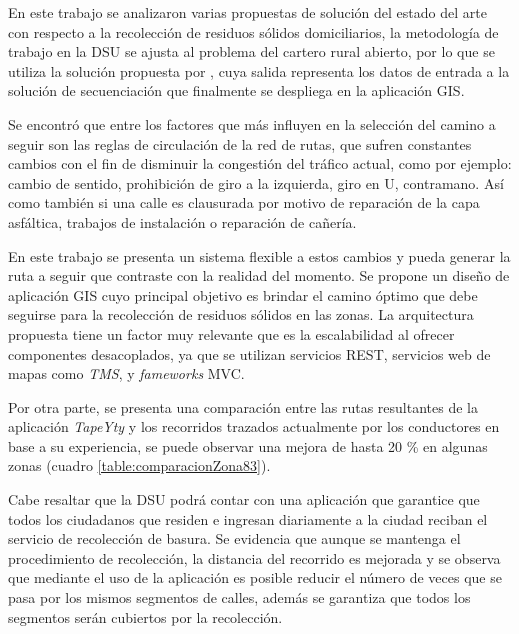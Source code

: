 


En este trabajo se analizaron varias propuestas de solución del estado del arte con respecto a la recolección de residuos sólidos domiciliarios, la metodología de trabajo en la DSU se ajusta al problema del cartero rural abierto, por lo que se utiliza la solución propuesta por \citet{Braier2017AnArgentina}, cuya salida representa los datos de entrada a la solución de secuenciación que finalmente se despliega en la aplicación GIS.

Se encontró que entre los factores que más influyen en la selección del camino a seguir son las reglas de circulación de la red de rutas, que sufren constantes cambios con el fin de disminuir la congestión del tráfico actual, como por ejemplo: cambio de sentido, prohibición de giro a la izquierda, giro en U, contramano. Así como también si una calle es clausurada por motivo de reparación de la capa asfáltica, trabajos de instalación o reparación de cañería.

En este trabajo se presenta un sistema flexible a estos cambios y pueda generar la ruta a seguir que contraste con la realidad del momento. Se propone un diseño de aplicación GIS cuyo principal objetivo es brindar el camino óptimo que debe seguirse para la recolección de residuos sólidos en las zonas. La arquitectura propuesta tiene un factor muy relevante que es la escalabilidad al ofrecer componentes desacoplados, ya que se utilizan servicios REST, servicios web de mapas como \textit{TMS}, y \textit{fameworks} MVC.

Por otra parte, se presenta una comparación entre las rutas resultantes de la aplicación \textit{TapeYty} y los recorridos trazados actualmente por los conductores en base a su experiencia, se puede observar una mejora de hasta 20 \% en algunas zonas (cuadro \ref{table:comparacionZona83}).

Cabe resaltar que la DSU podrá contar con una aplicación que garantice que todos los ciudadanos que residen e ingresan diariamente a la ciudad reciban el servicio de recolección de basura. Se evidencia que aunque se mantenga el procedimiento de recolección, la distancia del recorrido es mejorada y se observa que mediante el uso de la aplicación es posible reducir el número de veces que se pasa por los mismos segmentos de calles, además se garantiza que todos los segmentos serán cubiertos por la recolección.


